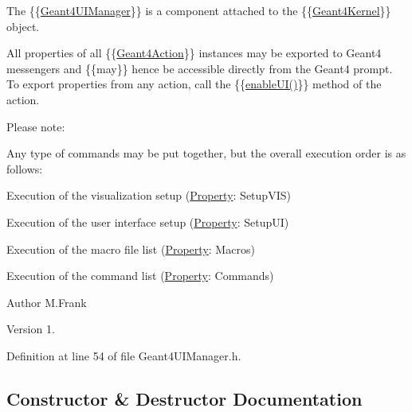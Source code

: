 The \{\{\hyperlink{class_d_d4hep_1_1_simulation_1_1_geant4_u_i_manager}{Geant4\+U\+I\+Manager}\}\} is a component attached to the \{\{\hyperlink{class_d_d4hep_1_1_simulation_1_1_geant4_kernel}{Geant4\+Kernel}\}\} object.

All properties of all \{\{\hyperlink{class_d_d4hep_1_1_simulation_1_1_geant4_action}{Geant4\+Action}\}\} instances may be exported to Geant4 messengers and \{{\itshape }\{may\}\} hence be accessible directly from the Geant4 prompt. To export properties from any action, call the \{\{\hyperlink{class_d_d4hep_1_1_simulation_1_1_geant4_action_a3cc9526eece0aaceec6b62fa74d8c055}{enable\+U\+I()}\}\} method of the action.

Please note\+:

Any type of commands may be put together, but the overall execution order is as follows\+:
\begin{DoxyEnumerate}
\item Execution of the visualization setup (\hyperlink{class_d_d4hep_1_1_property}{Property}\+: Setup\+V\+IS)
\item Execution of the user interface setup (\hyperlink{class_d_d4hep_1_1_property}{Property}\+: Setup\+UI)
\item Execution of the macro file list (\hyperlink{class_d_d4hep_1_1_property}{Property}\+: Macros)
\item Execution of the command list (\hyperlink{class_d_d4hep_1_1_property}{Property}\+: Commands)
\end{DoxyEnumerate}

\begin{DoxyAuthor}{Author}
M.\+Frank 
\end{DoxyAuthor}
\begin{DoxyVersion}{Version}
1. 
\end{DoxyVersion}


Definition at line 54 of file Geant4\+U\+I\+Manager.\+h.



\subsection{Constructor \& Destructor Documentation}
\hypertarget{class_d_d4hep_1_1_simulation_1_1_geant4_u_i_manager_a80b987d5f8456101424ab3c4ac69c08e}{}\label{class_d_d4hep_1_1_simulation_1_1_geant4_u_i_manager_a80b987d5f8456101424ab3c4ac69c08e} 
